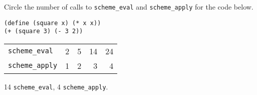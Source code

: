 \begin{blocksection}
\question Circle the number of calls to \lstinline$scheme_eval$ and
\lstinline$scheme_apply$ for the code below.

\begin{lstlisting}
(define (square x) (* x x))
(+ (square 3) (- 3 2))
\end{lstlisting}

\begin{tabular}{lrrrr}
\lstinline$scheme_eval$ & 2 & 5 & 14 & 24 \\
\lstinline$scheme_apply$ & 1 & 2 & 3 & 4
\end{tabular}

\begin{solution}[1in]
14 \lstinline$scheme_eval$, 4 \lstinline$scheme_apply$.
\end{solution}
\end{blocksection}
